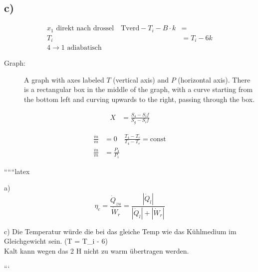\subsection*{c)}

\begin{align*}
x_1 \text{ direkt nach drossel} \quad \text{Tverd} - T_i - B \cdot k &= \\
T_i &= T_i - 6k \\
4 \rightarrow 1 \text{ adiabatisch}
\end{align*}

\begin{description}
    \item[Graph:] A graph with axes labeled $T$ (vertical axis) and $P$ (horizontal axis). There is a rectangular box in the middle of the graph, with a curve starting from the bottom left and curving upwards to the right, passing through the box.
\end{description}

\begin{align*}
X &= \frac{S_4 - S_if}{S_g - S_if}
\end{align*}

\begin{align*}
\frac{\dot{m}}{\dot{m}} &= 0 \quad \frac{T_4 - T_c}{T_4 - T_e} = \text{const} \\
\frac{\dot{m}}{\dot{m}} &= \frac{P_4}{P_1}
\end{align*}

``````latex


a) 
\[
\eta_{c} = \frac{\dot{Q}_{zu}}{\dot{W}_{r}} = \frac{\left| \dot{Q}_{l} \right|}{\left| \dot{Q}_{l} \right| + \left| \dot{W}_{r} \right|}
\]

c) Die Temperatur würde die  bei das gleiche Temp wie das Kühlmedium im Gleichgewicht sein. \quad (T = T_{i} - 6) \\
Kalt kann wegen das 2 H nicht  zu warm übertragen werden.

```